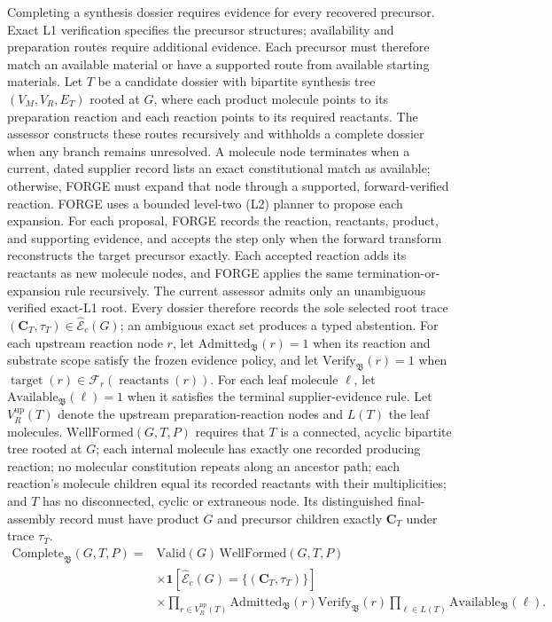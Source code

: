 Completing a synthesis dossier requires evidence for every recovered precursor. Exact L1
verification specifies the precursor structures; availability and preparation routes require
additional evidence. Each precursor must therefore match an available material or have a supported
route from available starting materials.
Let $T$ be a candidate dossier with bipartite synthesis tree $(V_M,V_R,E_T)$ rooted at $G$, where each product molecule
points to its preparation reaction and each reaction points to its required reactants.
The assessor constructs these routes recursively and withholds a complete dossier when any branch
remains unresolved.
A molecule node terminates when a current, dated supplier record lists an exact constitutional match
as available; otherwise, FORGE must expand that node through a supported, forward-verified reaction.
FORGE uses a bounded level-two (L2) planner to propose each expansion.
For each proposal, FORGE records the reaction, reactants, product, and supporting evidence, and
accepts the step only when the forward transform reconstructs the target precursor exactly.
Each accepted reaction adds its reactants as new molecule nodes, and FORGE applies the same
termination-or-expansion rule recursively.
The current assessor admits only an unambiguous verified exact-L1 root. Every dossier therefore
records the sole selected root trace
$(\mathbf C_T,\tau_T)\in\widehat{\mathcal E}_c(G)$; an ambiguous exact set produces a typed
abstention. For each upstream reaction node $r$, let
$\mathrm{Admitted}_{\mathfrak B}(r)=1$ when its reaction and substrate scope satisfy the frozen
evidence policy, and let $\mathrm{Verify}_{\mathfrak B}(r)=1$ when
$\operatorname{target}(r)\in\mathcal F_r(\operatorname{reactants}(r))$.
For each leaf molecule $\ell$, let $\mathrm{Available}_{\mathfrak B}(\ell)=1$ when it satisfies the terminal
supplier-evidence rule.
Let $V_R^{\mathrm{up}}(T)$ denote the upstream preparation-reaction nodes and $L(T)$ the leaf
molecules. $\mathrm{WellFormed}(G,T,P)$ requires that $T$ is a connected, acyclic bipartite tree
rooted at $G$; each internal molecule has exactly one recorded producing reaction; no molecular constitution repeats along an ancestor path; each reaction's
molecule children equal its recorded reactants with their multiplicities; and $T$ has no disconnected, cyclic or
extraneous node. Its distinguished final-assembly record must have product $G$ and precursor
children exactly $\mathbf C_T$ under trace $\tau_T$.
\begin{equation}
\begin{aligned}
    \mathrm{Complete}_{\mathfrak B}(G,T,P)
    ={}&\mathrm{Valid}(G)\,\mathrm{WellFormed}(G,T,P)\\
    &\times\mathbf1\!\left[\widehat{\mathcal E}_c(G)=\{(\mathbf C_T,\tau_T)\}\right]\\
    &\times\prod_{r\in V_R^{\mathrm{up}}(T)}
    \mathrm{Admitted}_{\mathfrak B}(r)\mathrm{Verify}_{\mathfrak B}(r)
    \prod_{\ell\in L(T)}\mathrm{Available}_{\mathfrak B}(\ell).
\end{aligned}
\end{equation}
